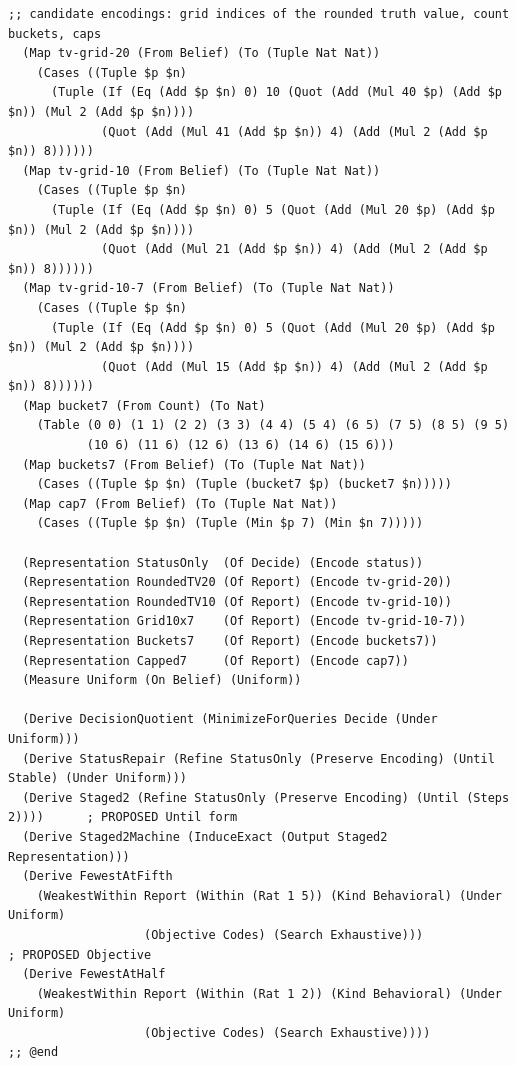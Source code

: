 \documentclass[11pt]{article}
\theoremstyle{definition}
\theoremstyle{plain}
\begin{document}
\begin{lstlisting}[style=mettafull]
  ;; candidate encodings: grid indices of the rounded truth value, count buckets, caps
  (Map tv-grid-20 (From Belief) (To (Tuple Nat Nat))
    (Cases ((Tuple $p $n)
      (Tuple (If (Eq (Add $p $n) 0) 10 (Quot (Add (Mul 40 $p) (Add $p $n)) (Mul 2 (Add $p $n))))
             (Quot (Add (Mul 41 (Add $p $n)) 4) (Add (Mul 2 (Add $p $n)) 8))))))
  (Map tv-grid-10 (From Belief) (To (Tuple Nat Nat))
    (Cases ((Tuple $p $n)
      (Tuple (If (Eq (Add $p $n) 0) 5 (Quot (Add (Mul 20 $p) (Add $p $n)) (Mul 2 (Add $p $n))))
             (Quot (Add (Mul 21 (Add $p $n)) 4) (Add (Mul 2 (Add $p $n)) 8))))))
  (Map tv-grid-10-7 (From Belief) (To (Tuple Nat Nat))
    (Cases ((Tuple $p $n)
      (Tuple (If (Eq (Add $p $n) 0) 5 (Quot (Add (Mul 20 $p) (Add $p $n)) (Mul 2 (Add $p $n))))
             (Quot (Add (Mul 15 (Add $p $n)) 4) (Add (Mul 2 (Add $p $n)) 8))))))
  (Map bucket7 (From Count) (To Nat)
    (Table (0 0) (1 1) (2 2) (3 3) (4 4) (5 4) (6 5) (7 5) (8 5) (9 5)
           (10 6) (11 6) (12 6) (13 6) (14 6) (15 6)))
  (Map buckets7 (From Belief) (To (Tuple Nat Nat))
    (Cases ((Tuple $p $n) (Tuple (bucket7 $p) (bucket7 $n)))))
  (Map cap7 (From Belief) (To (Tuple Nat Nat))
    (Cases ((Tuple $p $n) (Tuple (Min $p 7) (Min $n 7)))))

  (Representation StatusOnly  (Of Decide) (Encode status))
  (Representation RoundedTV20 (Of Report) (Encode tv-grid-20))
  (Representation RoundedTV10 (Of Report) (Encode tv-grid-10))
  (Representation Grid10x7    (Of Report) (Encode tv-grid-10-7))
  (Representation Buckets7    (Of Report) (Encode buckets7))
  (Representation Capped7     (Of Report) (Encode cap7))
  (Measure Uniform (On Belief) (Uniform))

  (Derive DecisionQuotient (MinimizeForQueries Decide (Under Uniform)))
  (Derive StatusRepair (Refine StatusOnly (Preserve Encoding) (Until Stable) (Under Uniform)))
  (Derive Staged2 (Refine StatusOnly (Preserve Encoding) (Until (Steps 2))))      ; PROPOSED Until form
  (Derive Staged2Machine (InduceExact (Output Staged2 Representation)))
  (Derive FewestAtFifth
    (WeakestWithin Report (Within (Rat 1 5)) (Kind Behavioral) (Under Uniform)
                   (Objective Codes) (Search Exhaustive)))                       ; PROPOSED Objective
  (Derive FewestAtHalf
    (WeakestWithin Report (Within (Rat 1 2)) (Kind Behavioral) (Under Uniform)
                   (Objective Codes) (Search Exhaustive))))
;; @end


\end{lstlisting}
\end{document}
